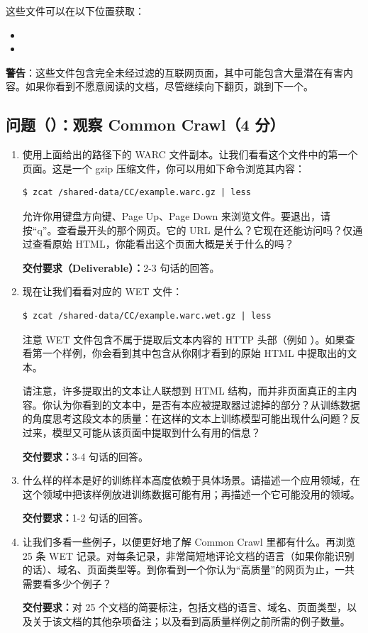 这些文件可以在以下位置获取：
\begin{itemize}
  \item {}
  \item {}
\end{itemize}

\textbf{警告}：这些文件包含完全未经过滤的互联网页面，其中可能包含大量潜在有害内容。如果你看到不愿意阅读的文档，尽管继续向下翻页，跳到下一个。

\subsection*{问题（）：观察 Common Crawl（4 分）}

\begin{enumerate}[label=(\alph*)]
  \item 使用上面给出的路径下的 WARC 文件副本。让我们看看这个文件中的第一个页面。这是一个 gzip 压缩文件，你可以用如下命令浏览其内容：

\begin{lstlisting}
$ zcat /shared-data/CC/example.warc.gz | less
\end{lstlisting}

   允许你用键盘方向键、Page Up、Page Down 来浏览文件。要退出，请按“q”。查看最开头的那个网页。它的 URL 是什么？它现在还能访问吗？仅通过查看原始 HTML，你能看出这个页面大概是关于什么的吗？

  \textbf{交付要求（Deliverable）：}2-3 句话的回答。

  \item 现在让我们看看对应的 WET 文件：

\begin{lstlisting}
$ zcat /shared-data/CC/example.warc.wet.gz | less
\end{lstlisting}

  注意 WET 文件包含不属于提取后文本内容的 HTTP 头部（例如 ）。如果查看第一个样例，你会看到其中包含从你刚才看到的原始 HTML 中提取出的文本。

  请注意，许多提取出的文本让人联想到 HTML 结构，而并非页面真正的主内容。你认为你看到的文本中，是否有本应被提取器过滤掉的部分？从训练数据的角度思考这段文本的质量：在这样的文本上训练模型可能出现什么问题？反过来，模型又可能从该页面中提取到什么有用的信息？

  \textbf{交付要求：}3-4 句话的回答。

  \item 什么样的样本是好的训练样本高度依赖于具体场景。请描述一个应用领域，在这个领域中把该样例放进训练数据可能有用；再描述一个它可能没用的领域。

  \textbf{交付要求：}1-2 句话的回答。

  \item 让我们多看一些例子，以便更好地了解 Common Crawl 里都有什么。再浏览 25 条 WET 记录。对每条记录，非常简短地评论文档的语言（如果你能识别的话）、域名、页面类型等。到你看到一个你认为“高质量”的网页为止，一共需要看多少个例子？

  \textbf{交付要求：}对 25 个文档的简要标注，包括文档的语言、域名、页面类型，以及关于该文档的其他杂项备注；以及看到高质量样例之前所需的例子数量。
\end{enumerate}


